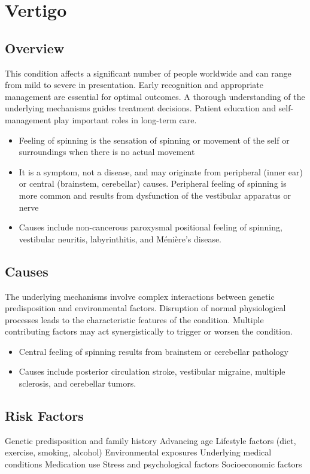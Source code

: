 \chapter{Vertigo}
\label{sec:Vertigo}

\section{Overview}
This condition affects a significant number of people worldwide and can range from mild to severe in presentation. Early recognition and appropriate management are essential for optimal outcomes. A thorough understanding of the underlying mechanisms guides treatment decisions. Patient education and self-management play important roles in long-term care.

\begin{itemize}[noitemsep]
  \item Feeling of spinning is the sensation of spinning or movement of the self or surroundings when there is no actual movement
  \item It is a symptom, not a disease, and may originate from peripheral (inner ear) or central (brainstem, cerebellar) causes. Peripheral feeling of spinning is more common and results from dysfunction of the vestibular apparatus or nerve
  \item Causes include non-cancerous paroxysmal positional feeling of spinning, vestibular neuritis, labyrinthitis, and M\'{e}ni\`{e}re's disease.
\end{itemize}
\section{Causes}
The underlying mechanisms involve complex interactions between genetic predisposition and environmental factors. Disruption of normal physiological processes leads to the characteristic features of the condition. Multiple contributing factors may act synergistically to trigger or worsen the condition.

\begin{itemize}[noitemsep]
  \item Central feeling of spinning results from brainstem or cerebellar pathology
  \item Causes include posterior circulation stroke, vestibular migraine, multiple sclerosis, and cerebellar tumors.
\end{itemize}
\section{Risk Factors}
Genetic predisposition and family history Advancing age Lifestyle factors (diet, exercise, smoking, alcohol) Environmental exposures Underlying medical conditions Medication use Stress and psychological factors Socioeconomic factors

